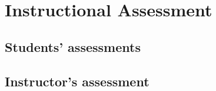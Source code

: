 \section{Instructional Assessment}\label{sec:Assessment}

    \subsection{Students' assessments}\label{sec:Student Assessment}

    \subsection{Instructor's assessment}\label{sec:Instructor Assessment}